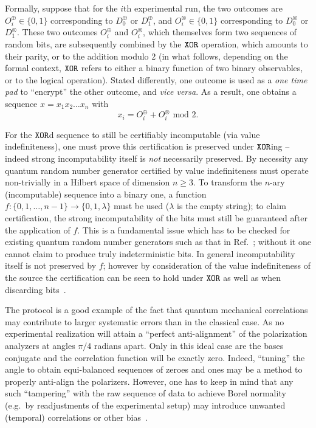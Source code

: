 \documentclass[%
 preprint,
 showpacs,
 showkeys,
 preprintnumbers,
  amsmath,amssymb,
  aps,
 pra,
  longbibliography,
  floatfix,
 ]{revtex4-1}
\theoremstyle{definition}
\begin{document}
Formally, suppose that for the $i$th experimental run, the two outcomes are
$O^\oplus_i \in \{0,1\}$ corresponding to $D^\oplus_0$ or  $D^\oplus_1$,
and
$O^\otimes_i \in \{0,1\}$  corresponding to $D^\otimes_0$ or  $D^\otimes_1$.
These two outcomes $O^\oplus_i $ and  $O^\otimes_i$, which themselves form two sequences of random bits,
are subsequently combined by the ${\tt XOR}$ operation, which amounts to their parity, or to the addition modulo 2
(in what follows, depending on the formal context,  ${\tt XOR}$ refers to either a binary function of two binary observables, or to the logical operation).
Stated differently, one outcome is used as a {\em one time pad} to ``encrypt'' the other outcome,
and {\it vice versa}.
As a result, one obtains a sequence $x=x_1x_2\ldots x_n$ with
\begin{equation}
x_i=O^\oplus_i + O^\otimes _{i} \text{ mod }2 .
\label{2010-qxor-e1}
\end{equation}

For the ${\tt XOR}$d sequence to still be certifiably incomputable (via value indefiniteness), one must prove this certification is preserved under ${\tt XOR}$ing --
indeed strong incomputability itself is {\em not} necessarily preserved.
By necessity any quantum random number generator certified by value indefiniteness must operate non-trivially in a Hilbert space of dimension $n\ge 3$.
To transform the $n$-ary (incomputable) sequence into a binary one, a function $f: \{0,1,\dots, n-1\} \to \{0,1,\lambda\}$ must be used ($\lambda$ is the empty string);
to claim certification, the strong incomputability of the bits must still be guaranteed after the application of $f$.
This is a fundamental issue which has to be checked for  existing quantum random number generators such as that in Ref.~\cite{10.1038/nature09008};
without it one cannot claim to produce truly indeterministic bits. In general incomputability itself is not preserved by $f$;
however by consideration of the value indefiniteness of the source the certification can be seen to hold under ${\tt XOR}$ as well as when discarding bits~\cite{Abbott:aa}.


The protocol is a good example of the fact that quantum mechanical correlations may contribute to larger systematic errors than in the classical case.
As no experimental realization will attain a ``perfect anti-alignment'' of the polarization analyzers  at angles $\pi /4$ radians apart.
Only in this ideal case are the bases conjugate and the correlation function will be exactly zero.
Indeed, ``tuning'' the angle to obtain equi-balanced sequences of zeroes and ones may be a method to properly anti-align the polarizers.
However, one has to keep in mind that any such ``tampering'' with the raw sequence of data
to achieve  Borel normality (e.g.\ by readjustments of the experimental setup)
may introduce unwanted (temporal) correlations or other bias~\cite{PhysRevA.82.022102}.
\end{document}
